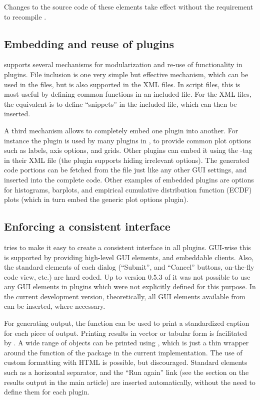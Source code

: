 Changes to the source code of these elements take effect without the requirement to recompile .

\subsection{Embedding and reuse of plugins}
\label{sec:technical_plugins_embedding}
 supports several mechanisms for modularization and re-use of
functionality in plugins. File inclusion is one very simple but effective
mechanism, which can be used in the  files, but is also supported in
the XML files. In script files, this is most useful by defining common functions
in an included file. For the XML files, the equivalent is to define ``snippets''
in the included file, which can then be inserted.

A third mechanism allows to completely embed one plugin into another. For
instance the  plugin is used by many plugins in , to provide
common plot options such as labels, axis options, and grids. Other plugins
can embed it using the -tag in their XML file (the plugin supports
hiding irrelevant options). The generated code portions can be fetched from the
 file just like any other GUI settings, and inserted into the complete
code. Other examples of embedded plugins are options for histograms, barplots,
and empirical cumulative distribution function (ECDF) plots (which in turn embed the generic plot options plugin).

\subsection{Enforcing a consistent interface}
\label{sec:technical_plugins_consistency}
 tries to make it easy to create a consistent interface in all plugins.
GUI-wise this is supported by providing high-level GUI elements, and embeddable
clients. Also, the standard elements of each dialog (``Submit'', and
``Cancel'' buttons, on-the-fly code view, etc.) are hard coded. Up to version
0.5.3 of  it was not possible to use any GUI elements in plugins which
were not explicitly defined for this purpose. In the current development
version, theoretically, all GUI elements available from  can be inserted,
where necessary.

For generating output, the function  can be used to print a
standardized caption for each piece of output. Printing results in vector or
tabular form is facilitated by . A wide range of objects can be
printed using , which is just a thin wrapper around the
 function of the  package \citep{Lecoutre2003} in the current
implementation. The use of custom formatting with HTML is possible, but
discouraged. Standard elements such as a horizontal separator, and the ``Run again''
link (see the section on the results output in the main article) are inserted automatically, without the need to define
them for each plugin.

